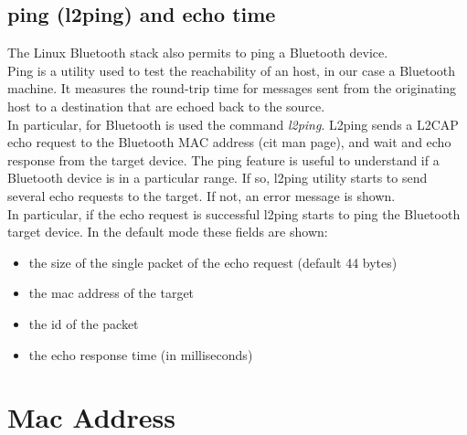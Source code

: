 \subsection{ping (l2ping) and echo time}
The Linux Bluetooth stack also permits to ping a Bluetooth device.\\
Ping is a utility used to test the reachability of an host, in our case a Bluetooth machine. It measures the round-trip time for messages sent from the originating host to a destination that are echoed back to the source.\\
In particular, for Bluetooth is used the command \textit{l2ping}. L2ping sends a L2CAP echo request to the Bluetooth MAC address (cit man page), and wait and echo response from the target device.
The ping feature is useful to understand if a Bluetooth device is in a particular range. If so, l2ping utility starts to send several echo requests to the target. If not, an error message is shown.\\

In particular, if the echo request is successful l2ping starts to ping the Bluetooth target device. In the default mode these fields are shown:\\
\begin{itemize}
\item the size of the single packet of the echo request (default 44 bytes)
\item the mac address of the target
\item the id of the packet
\item the echo response time (in milliseconds)
\end{itemize}

\section{Mac Address}

